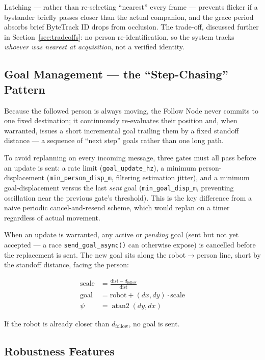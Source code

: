 Latching --- rather than re-selecting ``nearest'' every frame --- prevents flicker if a bystander briefly passes closer than the actual companion, and the grace period absorbs brief ByteTrack ID drops from occlusion. The trade-off, discussed further in Section~\ref{sec:tradeoffs}: no person re-identification, so the system tracks \emph{whoever was nearest at acquisition}, not a verified identity.
 
\subsection{Goal Management --- the ``Step-Chasing'' Pattern}
\label{sec:goal_management}
 
Because the followed person is always moving, the Follow Node never commits to one fixed destination; it continuously re-evaluates their position and, when warranted, issues a short incremental goal trailing them by a fixed standoff distance --- a sequence of ``next step'' goals rather than one long path.
 
To avoid replanning on every incoming message, three gates must all pass before an update is sent: a rate limit (\texttt{goal\_update\_hz}), a minimum person-displacement (\texttt{min\_person\_disp\_m}, filtering estimation jitter), and a minimum goal-displacement versus the last \emph{sent} goal (\texttt{min\_goal\_disp\_m}, preventing oscillation near the previous gate's threshold). This is the key difference from a naive periodic cancel-and-resend scheme, which would replan on a timer regardless of actual movement.
 
When an update is warranted, any active or \emph{pending} goal (sent but not yet accepted --- a race \texttt{send\_goal\_async()} can otherwise expose) is cancelled before the replacement is sent. The new goal sits along the robot$\rightarrow$person line, short by the standoff distance, facing the person:
 
\begin{align}
\text{scale} &= \frac{\text{dist} - d_{\text{follow}}}{\text{dist}} \\
\text{goal} &= \text{robot} + (dx, dy)\cdot \text{scale} \\
\psi &= \operatorname{atan2}(dy, dx)
\end{align}
 
If the robot is already closer than $d_{\text{follow}}$, no goal is sent.
 
\subsection{Robustness Features}
\label{sec:robustness}
 

